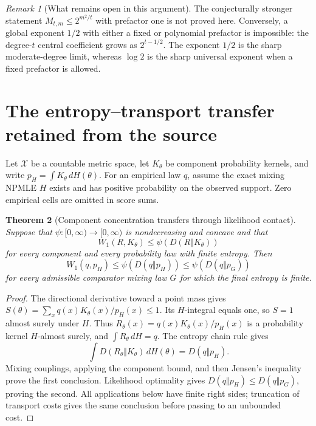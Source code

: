 \documentclass[11pt,a4paper]{article}
\newtheorem{theorem}{Theorem}[section]
\theoremstyle{definition}
\theoremstyle{remark}
\newtheorem{remark}[theorem]{Remark}
\numberwithin{equation}{section}
\begin{document}
\begin{remark}[What remains open in this argument]
The conjecturally stronger statement $M_{t,m}\le2^{m^2/t}$ with
prefactor one is not proved here. Conversely, a global exponent
$1/2$ with either a fixed or polynomial prefactor is impossible:
the degree-$t$ central coefficient grows as $2^{t-1/2}$.
The exponent $1/2$ is the sharp moderate-degree limit, whereas
$\log2$ is the sharp universal exponent when a fixed prefactor is allowed.
\end{remark}

\section{The entropy--transport transfer retained from the source}
\label{p8:et:section}

Let $\mathcal X$ be a countable metric space, let $K_\theta$ be component
probability kernels, and write $p_H=\int K_\theta\,dH(\theta)$.
For an empirical law $q$, assume the exact mixing NPMLE $H$ exists
and has positive probability on the observed support. Zero empirical
cells are omitted in score sums.

\begin{theorem}[Component concentration transfers through likelihood contact]
\label{p8:et:transfer}
Suppose that $\psi:[0,\infty)\to[0,\infty)$ is nondecreasing and
concave and that
\[
                 W_1(R,K_\theta)\le\psi(D(R\Vert K_\theta))
\]
for every component and every probability law with finite entropy.
Then
\[
             W_1(q,p_H)\le\psi(D(q\Vert p_H))
                       \le\psi(D(q\Vert p_G))
\]
for every admissible comparator mixing law $G$ for which the final
entropy is finite.
\end{theorem}
\begin{proof}
The directional derivative toward a point mass gives
$S(\theta)=\sum_xq(x)K_\theta(x)/p_H(x)\le1$.
Its $H$-integral equals one, so $S=1$ almost surely under $H$.
Thus $R_\theta(x)=q(x)K_\theta(x)/p_H(x)$ is a probability kernel
$H$-almost surely, and $\int R_\theta\,dH=q$. The entropy chain rule gives
\[
 \int D(R_\theta\Vert K_\theta)\,dH(\theta)=D(q\Vert p_H).
\]
Mixing couplings, applying the component bound, and then Jensen's
inequality prove the first conclusion. Likelihood optimality gives
$D(q\Vert p_H)\le D(q\Vert p_G)$, proving the second.
All applications below have finite right sides; truncation of transport
costs gives the same conclusion before passing to an unbounded cost.
\end{proof}
\end{document}
